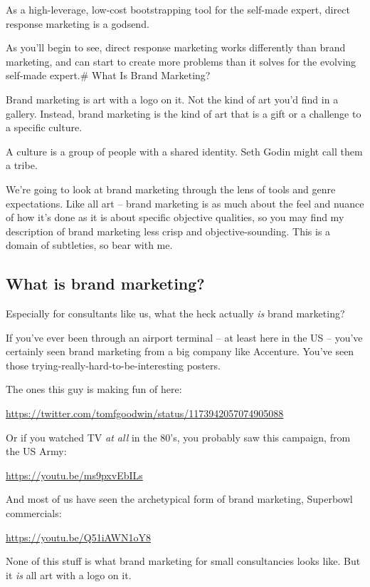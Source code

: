 \documentclass[13pt,]{tufte-handout}
\begin{document}
As a high-leverage, low-cost bootstrapping tool for the self-made
expert, direct response marketing is a godsend.

As you'll begin to see, direct response marketing works differently than
brand marketing, and can start to create more problems than it solves
for the evolving self-made expert.\# What Is Brand Marketing?

Brand marketing is art with a logo on it. Not the kind of art you'd find
in a gallery. Instead, brand marketing is the kind of art that is a gift
or a challenge to a specific culture.

A culture is a group of people with a shared identity. Seth Godin might
call them a tribe.

We're going to look at brand marketing through the lens of tools and
genre expectations. Like all art -- brand marketing is as much about the
feel and nuance of how it's done as it is about specific objective
qualities, so you may find my description of brand marketing less crisp
and objective-sounding. This is a domain of subtleties, so bear with me.

\hypertarget{what-is-brand-marketing}{%
\subsection{What is brand marketing?}\label{what-is-brand-marketing}}

Especially for consultants like us, what the heck actually \emph{is}
brand marketing?

If you've ever been through an airport terminal -- at least here in the
US -- you've certainly seen brand marketing from a big company like
Accenture. You've seen those trying-really-hard-to-be-interesting
posters.

The ones this guy is making fun of here:

\url{https://twitter.com/tomfgoodwin/status/1173942057074905088}

Or if you watched TV \emph{at all} in the 80's, you probably saw this
campaign, from the US Army:

\url{https://youtu.be/ms9pxvEbILs}

And most of us have seen the archetypical form of brand marketing,
Superbowl commercials:

\url{https://youtu.be/Q51iAWN1oY8}

None of this stuff is what brand marketing for small consultancies looks
like. But it \emph{is} all art with a logo on it.
\end{document}
